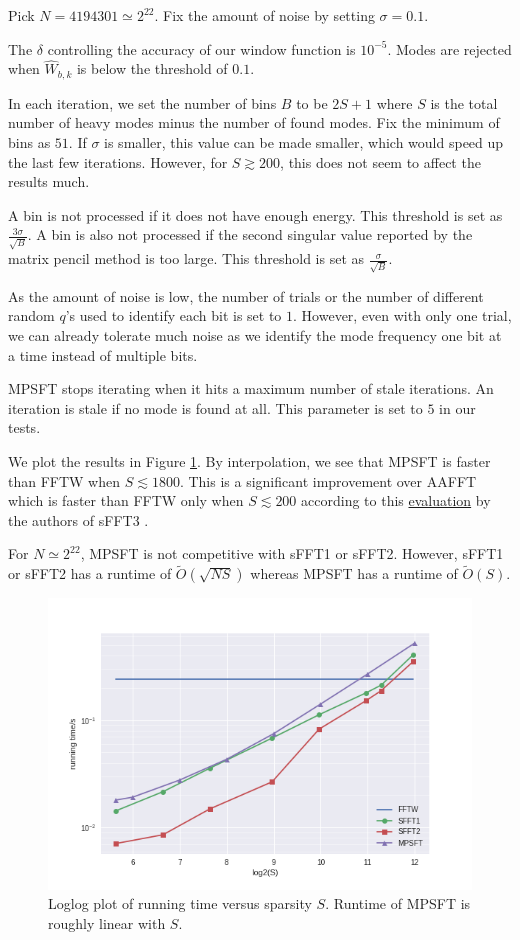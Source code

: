 \documentclass[10pt]{article}
\begin{document}
Pick $N=4194301\simeq 2^{22}$. Fix the amount of noise by setting $\sigma=0.1$.

The $\delta$ controlling the accuracy of our window function is $10^{-5}$. Modes are rejected when $\hat{W}_{b,k}$ is below the threshold of $0.1$.

In each iteration, we set the number of bins $B$ to be $2S+1$ where $S$ is the total number of heavy modes minus the number of found modes. Fix the minimum of bins as $51$. If $\sigma$ is smaller, this value can be made smaller, which would speed up the last few iterations. However, for $S\gtrsim 200$, this does not seem to affect the results much.

A bin is not processed if it does not have enough energy. This threshold is set as $\frac{3\sigma}{\sqrt{B}}$. A bin is also not processed if the second singular value reported by the matrix pencil method is too large. This threshold is set as $\frac{\sigma}{\sqrt{B}}$.

As the amount of noise is low, the number of trials or the number of different random $q$'s used to identify each bit is set to $1$. However, even with only one trial, we can already tolerate much noise as we identify the mode frequency one bit at a time instead of multiple bits.

MPSFT stops iterating when it hits a maximum number of stale iterations. An iteration is stale if no mode is found at all. This parameter is set to $5$ in our tests.

We plot the results in Figure \ref{fig:runtime_vary_k}. By interpolation, we see that MPSFT is faster than FFTW when $S\lesssim 1800$. This is a significant improvement over AAFFT which is faster than FFTW only when $S \lesssim 200$ according to this \href{https://groups.csail.mit.edu/netmit/sFFT/results.html}{evaluation} by the authors of sFFT3 \cite{hassanieh2012simple}.

For $N\simeq 2^{22}$, MPSFT is not competitive with sFFT1 or sFFT2. However, sFFT1 or sFFT2 has a runtime of $\tilde{O}(\sqrt{NS})$ whereas MPSFT has a runtime of $\tilde{O}(S)$.

\begin{figure}
\centering
\includegraphics[scale=0.6]{./graph/runtime_vary_k}
\caption{Loglog plot of running time versus sparsity $S$. Runtime of MPSFT is roughly linear with $S$. \label{fig:runtime_vary_k}}
\end{figure}
\end{document}
